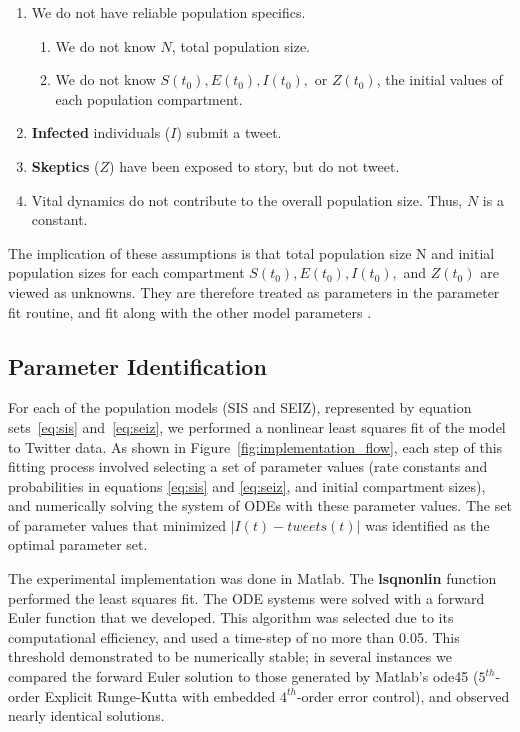 \begin{enumerate}
\item   We do not have reliable population specifics.
	\begin{enumerate}
    		\item We do not know $N$, total population size.
    		\item We do not know $S(t_0), E(t_0), I(t_0), $ or $Z(t_0)$,  the initial values of each population compartment.
  	\end{enumerate}
\item  {\bf Infected} individuals ($I$) submit a tweet.

\item  {\bf Skeptics} ($Z$) have been exposed to story, but do not tweet.

\item  Vital dynamics do not contribute to the overall population size. Thus, $N$ is a constant.
\end{enumerate}


The implication of these assumptions is that total population size N and initial population sizes for each compartment $S(t_0), E(t_0), I(t_0), $ and $Z(t_0)$ are viewed as unknowns. They are therefore treated as parameters in the parameter fit routine, and fit along with the other model parameters \cite{powerofgoodidea:2006}.

\subsection{Parameter Identification}

For each of the population models (SIS and SEIZ), represented by equation sets~\ref{eq:sis} and~\ref{eq:seiz}, we performed a nonlinear least squares fit of the model to Twitter data. As shown in Figure~\ref{fig:implementation_flow}, each step of this fitting process involved selecting a set of parameter values (rate constants and probabilities in equations \ref{eq:sis} and \ref{eq:seiz}, and initial compartment sizes), and numerically solving the system of ODEs with these parameter values. The set of parameter values that minimized $|I(t)-tweets(t)|$ was identified as the optimal parameter set.

The experimental implementation was done in Matlab. The {\bf lsqnonlin} function performed the least squares fit. The ODE systems were solved with a forward Euler function that we developed. This algorithm was selected due to its computational efficiency, and used a time-step of no more than 0.05. This threshold demonstrated to be numerically stable; in several instances we compared the forward Euler solution to those generated by Matlab's ode45 ($5^{th}$-order Explicit Runge-Kutta with embedded $4^{th}$-order error control), and observed nearly identical solutions.



